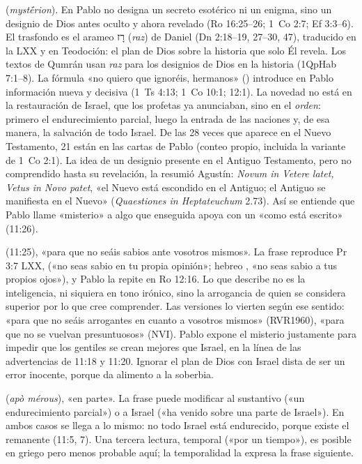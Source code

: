 \textbf{} (\emph{mystḗrion}). En Pablo no designa un secreto esotérico ni un enigma, sino un designio de Dios antes oculto y ahora revelado (Ro 16:25--26; 1~Co 2:7; Ef 3:3--6). El trasfondo es el arameo \foreignlanguage{hebrew}{רָז} (\emph{raz}) de Daniel (Dn 2:18--19, 27--30, 47), traducido  en la LXX y en Teodoción: el plan de Dios sobre la historia que solo Él revela. Los textos de Qumrán usan \emph{raz} para los designios de Dios en la historia (1QpHab 7:1--8). La fórmula «no quiero que ignoréis, hermanos» () introduce en Pablo información nueva y decisiva (1~Ts 4:13; 1~Co 10:1; 12:1). La novedad no está en la restauración de Israel, que los profetas ya anunciaban, sino en el \emph{orden}: primero el endurecimiento parcial, luego la entrada de las naciones y, de esa manera, la salvación de todo Israel. De las 28 veces que  aparece en el Nuevo Testamento, 21 están en las cartas de Pablo (conteo propio, incluida la variante de 1~Co 2:1). La idea de un designio presente en el Antiguo Testamento, pero no comprendido hasta su revelación, la resumió Agustín: \emph{Novum in Vetere latet, Vetus in Novo patet}, «el Nuevo está escondido en el Antiguo; el Antiguo se manifiesta en el Nuevo» (\emph{Quaestiones in Heptateuchum} 2.73). Así se entiende que Pablo llame «misterio» a algo que enseguida apoya con un «como está escrito» (11:26).

\textbf{} (11:25), «para que no seáis sabios ante vosotros mismos». La frase reproduce Pr 3:7 LXX,  («no seas sabio en tu propia opinión»; hebreo , «no seas sabio a tus propios ojos»), y Pablo la repite en Ro 12:16. Lo que describe no es la inteligencia, ni siquiera en tono irónico, sino la arrogancia de quien se considera superior por lo que cree comprender. Las versiones lo vierten según ese sentido: «para que no seáis arrogantes en cuanto a vosotros mismos» (RVR1960), «para que no se vuelvan presuntuosos» (NVI). Pablo expone el misterio justamente para impedir que los gentiles se crean mejores que Israel, en la línea de las advertencias de 11:18 y 11:20. Ignorar el plan de Dios con Israel dista de ser un error inocente, porque da alimento a la soberbia.

\textbf{} (\emph{apò mérous}), «en parte». La frase puede modificar al sustantivo («un endurecimiento parcial») o a Israel («ha venido sobre una parte de Israel»). En ambos casos se llega a lo mismo: no todo Israel está endurecido, porque existe el remanente (11:5, 7). Una tercera lectura, temporal («por un tiempo»), es posible en griego pero menos probable aquí; la temporalidad la expresa la frase siguiente.

